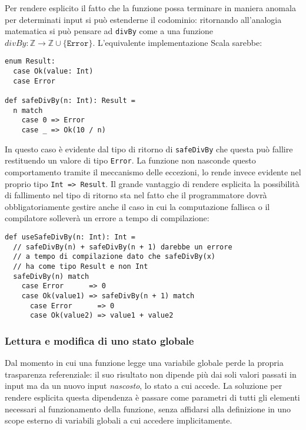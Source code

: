 Per rendere esplicito il fatto che la funzione possa terminare in maniera anomala per determinati input si può estenderne il codominio: ritornando all'analogia matematica si può pensare ad \lstinline{divBy} come a una funzione $divBy : \mathbb{Z} \rightarrow \mathbb{Z} \cup \{ \texttt{Error} \}$.
  L'equivalente implementazione Scala sarebbe:
  \begin{lstlisting}[language=scala3]
enum Result:
  case Ok(value: Int)
  case Error

def safeDivBy(n: Int): Result =
  n match
    case 0 => Error
    case _ => Ok(10 / n)
\end{lstlisting}
  In questo caso è evidente dal tipo di ritorno di \lstinline|safeDivBy| che questa può fallire restituendo un valore di tipo \lstinline{Error}.
  La funzione non nasconde questo comportamento tramite il meccanismo delle eccezioni, lo rende invece evidente nel proprio tipo \lstinline{Int => Result}.
  Il grande vantaggio di rendere esplicita la possibilità di fallimento nel tipo di ritorno sta nel fatto che il programmatore dovrà obbligatoriamente gestire anche il caso in cui la computazione fallisca o il compilatore solleverà un errore a tempo di compilazione:
  \begin{lstlisting}[language=scala3]
def useSafeDivBy(n: Int): Int =
  // safeDivBy(n) + safeDivBy(n + 1) darebbe un errore
  // a tempo di compilazione dato che safeDivBy(x)
  // ha come tipo Result e non Int
  safeDivBy(n) match
    case Error      => 0
    case Ok(value1) => safeDivBy(n + 1) match
      case Error      => 0
      case Ok(value2) => value1 + value2
\end{lstlisting}

  \subsubsection{Lettura e modifica di uno stato globale}
  \label{lettura-e-modifica-di-uno-stato-globale}

  Dal momento in cui una funzione legge una variabile globale perde la propria trasparenza referenziale: il suo risultato non dipende più dai soli valori passati in input ma da un nuovo input \emph{nascosto}, lo stato a cui accede.
  La soluzione per rendere esplicita questa dipendenza è passare come parametri di tutti gli elementi necessari al funzionamento della funzione, senza affidarsi alla definizione in uno scope esterno di variabili globali a cui accedere implicitamente.

